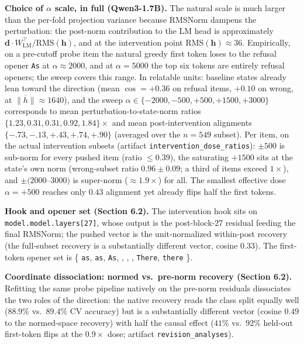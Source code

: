 \textbf{Choice of \(\alpha\) scale, in full (Qwen3-1.7B).} The natural
scale is much larger than the per-fold projection variance because
RMSNorm dampens the perturbation: the post-norm contribution to the LM
head is approximately
\(\mathbf{d} \cdot W_{\mathrm{LM}}^\top / \mathrm{RMS}(\mathbf{h})\),
and at the intervention point \(\mathrm{RMS}(\mathbf{h}) \approx 36\).
Empirically, on a pre-cutoff probe item the natural greedy first token
loses to the refusal opener \texttt{As} at \(\alpha \approx 2000\), and
at \(\alpha = 5000\) the top six tokens are entirely refusal openers;
the sweep covers this range. In relatable units: baseline states already
lean toward the direction (mean \(\cos = +0.36\) on refusal items,
\(+0.10\) on wrong, at \(\overline{\|h\|} \approx 1640\)), and the
sweep \(\alpha \in \{-2000, -500, +500, +1500, +3000\}\) corresponds
to mean perturbation-to-state-norm ratios
\(\{1.23, 0.31, 0.31, 0.92, 1.84\}\times\) and mean post-intervention
alignments \(\{-.73, -.13, +.43, +.74, +.90\}\) (averaged over the
\(n=549\) subset). Per item, on the actual intervention subsets
(artifact \texttt{intervention\_dose\_ratios}): \(\pm 500\) is
sub-norm for every pushed item (ratio \(\le 0.39\)), the saturating
\(+1500\) sits at the state's own norm (wrong-subset ratio
\(0.96 \pm 0.09\); a third of items exceed \(1\times\)), and
\(\pm(2000\)--\(3000)\) is super-norm (\(\approx 1.9\times\)) for
all. The smallest effective dose \(\alpha = +500\) reaches only
\(0.43\) alignment yet already flips half the first tokens.

\textbf{Hook and opener set (Section 6.2).} The intervention hook sits
on \texttt{model.model.layers{[}27{]}}, whose output is the
post-block-27 residual feeding the final RMSNorm; the pushed vector is
the unit-normalized within-post recovery (the full-subset recovery is a
substantially different vector, cosine \(0.33\)). The first-token
opener set is \{ \texttt{as}, \texttt{as}, \texttt{As}, \texttt{},
\texttt{}, \texttt{}, \texttt{There}, \texttt{there} \}.

\textbf{Coordinate dissociation: normed vs.~pre-norm recovery (Section
6.2).} Refitting the same probe pipeline natively on the pre-norm
residuals dissociates the two roles of the direction: the native
recovery reads the class split equally well (\(88.9\%\) vs.\
\(89.4\%\) CV accuracy) but is a substantially different vector
(cosine \(0.49\) to the normed-space recovery) with half the causal effect (\(41\%\) vs.~\(92\%\) held-out first-token flips at the
\(0.9\times\) dose; artifact \texttt{revision\_analyses}).

